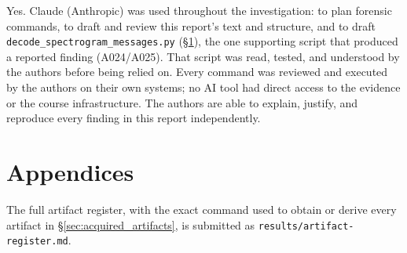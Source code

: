 \documentclass[11pt,a4paper,final,oneside]{article}
\begin{document}

Yes. Claude (Anthropic) was used throughout the investigation: to plan forensic commands, to draft
and review this report's text and structure, and to draft
\texttt{decode\_spectrogram\_messages.py} (\S\ref{sec:appendices}), the one supporting script
that produced a reported finding (A024/A025). That script was read, tested, and understood by the
authors before being relied on. Every command was reviewed and executed by the authors on their
own systems; no AI tool had direct access to the evidence or the course
infrastructure. The authors are able to explain, justify, and reproduce every finding in this
report independently.


\section{Appendices}
\label{sec:appendices}

The full artifact register, with the exact command used to obtain or derive every artifact in
\S\ref{sec:acquired_artifacts}, is submitted as \texttt{results/artifact-register.md}.
\end{document}
